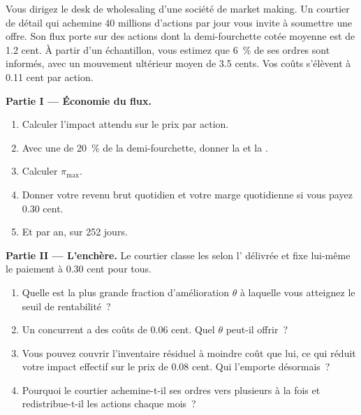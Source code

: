 \begin{problem}\label{pb:m1:retail-flow-and-wholesaling:1}
Vous dirigez le desk de wholesaling d'une société de market making. Un courtier de détail qui achemine
40 millions d'actions par jour vous invite à soumettre une offre. Son flux porte sur des actions dont la
demi-fourchette cotée moyenne est de 1.2 cent. À partir d'un échantillon, vous estimez que 6~\%
de ses ordres sont informés, avec un mouvement ultérieur moyen de 3.5 cents. Vos coûts
s'élèvent à 0.11 cent par action.

\medskip\noindent\textbf{Partie I --- Économie du flux.}
\begin{enumerate}
\item Calculer l'impact attendu sur le prix par action.
\item Avec une  de 20~\% de la demi-fourchette, donner la
 et la .
\item Calculer $\pi_{\max}$.
\item Donner votre revenu brut quotidien et votre marge quotidienne si vous payez 0.30 cent.
\item Et par an, sur 252 jours.
\end{enumerate}

\medskip\noindent\textbf{Partie II --- L'enchère.}
Le courtier classe les  selon l' délivrée et fixe
lui-même le paiement à 0.30 cent pour tous.
\begin{enumerate}[resume]
\item Quelle est la plus grande fraction d'amélioration $\theta$ à laquelle vous atteignez
le seuil de rentabilité~?
\item Un concurrent a des coûts de 0.06 cent. Quel $\theta$ peut-il offrir~?
\item Vous pouvez couvrir l'inventaire résiduel à moindre coût que lui, ce qui réduit
votre impact effectif sur le prix de 0.08 cent. Qui l'emporte désormais~?
\item Pourquoi le courtier achemine-t-il ses ordres vers plusieurs  à la fois et redistribue-t-il
les actions chaque mois~?
\end{enumerate}


\end{problem}
